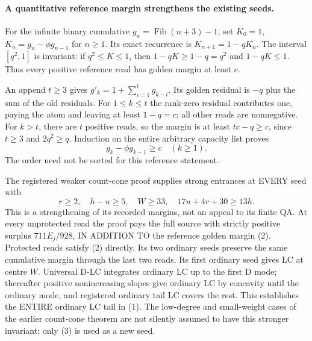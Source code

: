 \paragraph{A quantitative reference margin strengthens the existing seeds.}
For the infinite binary cumulative $g_n=\operatorname{Fib}(n+3)-1$,
set $K_0=1$, $K_n=g_n-\phi g_{n-1}$ for $n\ge1$.
Its exact recurrence is $K_{n+1}=1-qK_n$. The interval $[q^2,1]$
is invariant: if $q^2\le K\le1$, then
$1-qK\ge1-q=q^2$ and $1-qK\le1$.
Thus every positive reference read has golden margin at least $c$.

An append $t\ge3$ gives $g'_k=1+\sum_{i=1}^t g_{k-i}$.
Its golden residual is $-q$ plus the sum of the old residuals.
For $1\le k\le t$ the rank-zero residual contributes one, paying
the atom and leaving at least $1-q=c$; all other reads are nonnegative.
For $k>t$, there are $t$ positive reads, so the margin is at least
$tc-q\ge c$, since $t\ge3$ and $2q^2\ge q$.
Induction on the entire arbitrary capacity list proves
\[
                g_k-\phi g_{k-1}\ge c\quad(k\ge1).    \tag{2}
\]
The order need not be sorted for this reference statement.

The registered weaker count-cone proof supplies strong entrances at
EVERY seed with
\[
 r\ge2,\quad h-u\ge5,\quad W\ge33,\quad
                    17u+4r+30\ge13h.                \tag{3}
\]
This is a strengthening of its recorded margins, not an appeal to its
finite QA. At every unprotected read the proof pays the full source
with strictly positive surplus $711E_j/928$, IN ADDITION TO the
reference golden margin (2). Protected reads satisfy (2) directly.
Its two ordinary seeds preserve the same cumulative margin through
the last two reads. Its first ordinary seed gives LC at centre $W$.
Universal D-LC integrates ordinary LC up to the first D mode;
thereafter positive nonincreasing slopes give ordinary LC by concavity
until the ordinary mode, and registered ordinary tail LC covers the rest.
This establishes the ENTIRE ordinary LC tail in (1).
The low-degree and small-weight cases of the earlier count-cone theorem
are not silently assumed to have this stronger invariant; only (3) is
used as a new seed.

